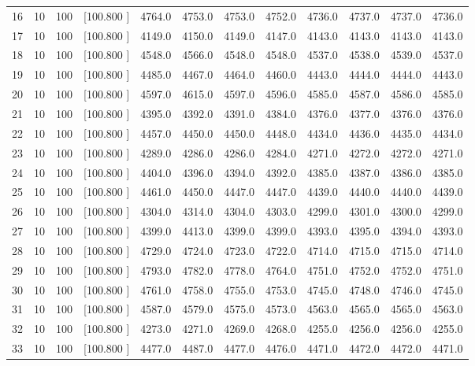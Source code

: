 \documentclass[12pt,a4paper]{article}
\begin{document}
\begin{center}
{\begin{tabular}{r r r r r r r r r r r r}
  16& 10&100&[100.800   ]&  4764.0&  4753.0&  4753.0&  4752.0&  4736.0&  4737.0&  4737.0&  4736.0\\[-0.02in]
  17& 10&100&[100.800   ]&  4149.0&  4150.0&  4149.0&  4147.0&  4143.0&  4143.0&  4143.0&  4143.0\\[-0.02in]
  18& 10&100&[100.800   ]&  4548.0&  4566.0&  4548.0&  4548.0&  4537.0&  4538.0&  4539.0&  4537.0\\[-0.02in]
  19& 10&100&[100.800   ]&  4485.0&  4467.0&  4464.0&  4460.0&  4443.0&  4444.0&  4444.0&  4443.0\\[-0.02in]
  20& 10&100&[100.800   ]&  4597.0&  4615.0&  4597.0&  4596.0&  4585.0&  4587.0&  4586.0&  4585.0\\[-0.02in]
  21& 10&100&[100.800   ]&  4395.0&  4392.0&  4391.0&  4384.0&  4376.0&  4377.0&  4376.0&  4376.0\\[-0.02in]
  22& 10&100&[100.800   ]&  4457.0&  4450.0&  4450.0&  4448.0&  4434.0&  4436.0&  4435.0&  4434.0\\[-0.02in]
  23& 10&100&[100.800   ]&  4289.0&  4286.0&  4286.0&  4284.0&  4271.0&  4272.0&  4272.0&  4271.0\\[-0.02in]
  24& 10&100&[100.800   ]&  4404.0&  4396.0&  4394.0&  4392.0&  4385.0&  4387.0&  4386.0&  4385.0\\[-0.02in]
  25& 10&100&[100.800   ]&  4461.0&  4450.0&  4447.0&  4447.0&  4439.0&  4440.0&  4440.0&  4439.0\\[-0.02in]
  26& 10&100&[100.800   ]&  4304.0&  4314.0&  4304.0&  4303.0&  4299.0&  4301.0&  4300.0&  4299.0\\[-0.02in]
  27& 10&100&[100.800   ]&  4399.0&  4413.0&  4399.0&  4399.0&  4393.0&  4395.0&  4394.0&  4393.0\\[-0.02in]
  28& 10&100&[100.800   ]&  4729.0&  4724.0&  4723.0&  4722.0&  4714.0&  4715.0&  4715.0&  4714.0\\[-0.02in]
  29& 10&100&[100.800   ]&  4793.0&  4782.0&  4778.0&  4764.0&  4751.0&  4752.0&  4752.0&  4751.0\\[-0.02in]
  30& 10&100&[100.800   ]&  4761.0&  4758.0&  4755.0&  4753.0&  4745.0&  4748.0&  4746.0&  4745.0\\[-0.02in]
  31& 10&100&[100.800   ]&  4587.0&  4579.0&  4575.0&  4573.0&  4563.0&  4565.0&  4565.0&  4563.0\\[-0.02in]
  32& 10&100&[100.800   ]&  4273.0&  4271.0&  4269.0&  4268.0&  4255.0&  4256.0&  4256.0&  4255.0\\[-0.02in]
  33& 10&100&[100.800   ]&  4477.0&  4487.0&  4477.0&  4476.0&  4471.0&  4472.0&  4472.0&  4471.0\\[-0.02in]

\end{tabular}}
\end{center}
\end{document}
